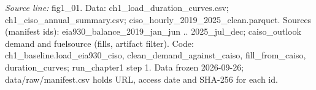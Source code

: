 {\scriptsize\textit{Source line:} fig1\_\allowbreak{}01. Data: ch1\_\allowbreak{}load\_\allowbreak{}duration\_\allowbreak{}curves.csv; ch1\_\allowbreak{}ciso\_\allowbreak{}annual\_\allowbreak{}summary.csv; ciso\_\allowbreak{}hourly\_\allowbreak{}2019\_\allowbreak{}2025\_\allowbreak{}clean.parquet. Sources (manifest ids): eia930\_\allowbreak{}balance\_\allowbreak{}2019\_\allowbreak{}jan\_\allowbreak{}jun .. 2025\_\allowbreak{}jul\_\allowbreak{}dec; caiso\_\allowbreak{}outlook demand and fuelsource (fills, artifact filter). Code: ch1\_\allowbreak{}baseline.load\_\allowbreak{}eia930\_\allowbreak{}ciso, clean\_\allowbreak{}demand\_\allowbreak{}against\_\allowbreak{}caiso, fill\_\allowbreak{}from\_\allowbreak{}caiso, duration\_\allowbreak{}curves; run\_\allowbreak{}chapter1 step 1. Data frozen 2026-09-26; data/raw/manifest.csv holds URL, access date and SHA-256 for each id.}